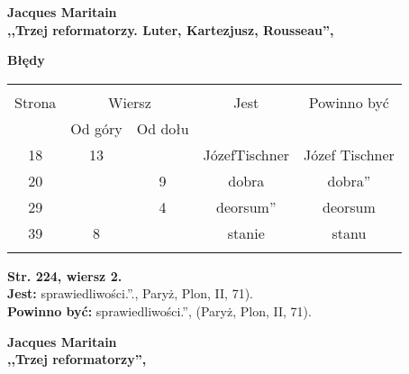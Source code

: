 \documentclass[a4paper,11pt]{article}
\newcommand{\spaceOne}{2em}
\newcommand{\tb}{\textbf}
\newcommand{\noi}{\noindent}
\newcommand{\Center}[1]{\begin{center} #1 \end{center}}
\newcommand{\CenterTB}[1]{\Center{\tb{#1}}}
\newcommand{\StrWg}[2]{\tb{Str. #1, wiersz #2.}}
\newcommand{\Jest}{\tb{Jest: }}
\newcommand{\Pow}{\tb{Powinno być: }}
\newcommand{\Work}[1]{ \begin{center} {\large \tb{#1}} \end{center} }
\begin{document}
\vspace{\spaceOne}





\Work{
  Jacques Maritain \\
  ,,Trzej reformatorzy. Luter, Kartezjusz, Rousseau'', \cite{Maritan05} }


\CenterTB{Błędy}
\begin{center}
  \begin{tabular}{|c|c|c|c|c|}
    \hline
    & \multicolumn{2}{c|}{} & & \\
    Strona & \multicolumn{2}{c|}{Wiersz}& Jest & Powinno być \\ \cline{2-3}
    & Od góry & Od dołu &  &  \\ \hline
    18 & 13 & & JózefTischner & Józef Tischner \\
    20 & & 9 & dobra & dobra'' \\
    29 & & 4 & deorsum'' & deorsum \\
    39 & 8 & & stanie & stanu \\
    & & & & \\ \hline
  \end{tabular}
\end{center}
\noi
\StrWg{224}{2} \\
\Jest sprawiedliwości.''., Paryż, Plon, II, 71). \\
\Pow sprawiedliwości.'', (Paryż, Plon, II, 71). \\

\vspace{\spaceOne}





\Work{
  Jacques Maritain \\
  ,,Trzej reformatorzy'', \cite{JMTR} }


%
%
%
\end{document}
